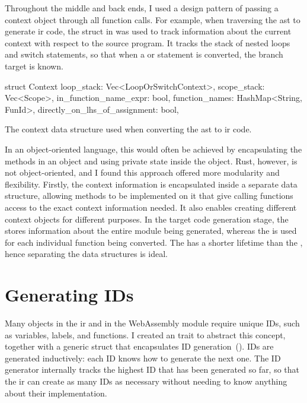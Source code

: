 \documentclass[../00-main.tex]{subfiles}
\begin{document}
Throughout the middle and back ends, I used a design pattern of passing a context object through all function calls.
For example, when traversing the \gls{ast} to generate \gls{ir} code, the  struct in  was used to track information about the current context with respect to the source program.
It tracks the stack of nested loops and switch statements, so that when a  or  statement is converted, the branch target is known.

\begin{listing}[t]
  \begin{RustListing}
    struct Context {
        loop_stack: Vec<LoopOrSwitchContext>,
        scope_stack: Vec<Scope>,
        in_function_name_expr: bool,
        function_names: HashMap<String, FunId>,
        directly_on_lhs_of_assignment: bool,
    }
  \end{RustListing}
  \caption{The context data structure used when converting the \gls{ast} to \gls{ir} code.}
  \label{lst:AST to IR context struct}
\end{listing}

In an object-oriented language, this would often be achieved by encapsulating the methods in an object and using private state inside the object.
Rust, however, is not object-oriented, and I found this approach offered more modularity and flexibility.
Firstly, the context information is encapsulated inside a separate data structure, allowing methods to be implemented on it that give calling functions access to the exact context information needed.
It also enables creating different context objects for different purposes.
In the target code generation stage, the  stores information about the entire module being generated, whereas the  is used for each individual function being converted.
The  has a shorter lifetime than the , hence separating the data structures is ideal.

\section{Generating IDs}\label{app:sec:generating IDs}

Many objects in the \gls{ir} and in the WebAssembly module require unique IDs, such as variables, labels, and functions.
I created an  trait to abstract this concept, together with a generic  struct that encapsulates ID generation~().
IDs are generated inductively: each ID knows how to generate the next one.
The ID generator internally tracks the highest ID that has been generated so far, so that the \gls{ir} can create as many IDs as necessary without needing to know anything about their implementation.
\end{document}
